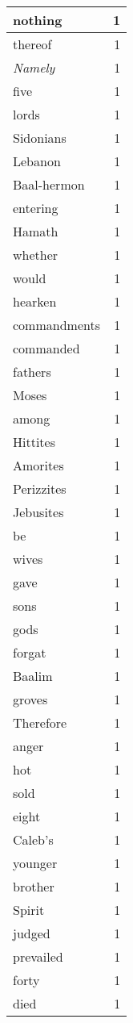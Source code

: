 \begin{center}
\begin{longtable}{l|r}
nothing & 1 \\ \hline
thereof & 1 \\ \hline
\emph{Namely} & 1 \\ \hline
five & 1 \\ \hline
lords & 1 \\ \hline
Sidonians & 1 \\ \hline
Lebanon & 1 \\ \hline
Baal-hermon & 1 \\ \hline
entering & 1 \\ \hline
Hamath & 1 \\ \hline
whether & 1 \\ \hline
would & 1 \\ \hline
hearken & 1 \\ \hline
commandments & 1 \\ \hline
commanded & 1 \\ \hline
fathers & 1 \\ \hline
Moses & 1 \\ \hline
among & 1 \\ \hline
Hittites & 1 \\ \hline
Amorites & 1 \\ \hline
Perizzites & 1 \\ \hline
Jebusites & 1 \\ \hline
be & 1 \\ \hline
wives & 1 \\ \hline
gave & 1 \\ \hline
sons & 1 \\ \hline
gods & 1 \\ \hline
forgat & 1 \\ \hline
Baalim & 1 \\ \hline
groves & 1 \\ \hline
Therefore & 1 \\ \hline
anger & 1 \\ \hline
hot & 1 \\ \hline
sold & 1 \\ \hline
eight & 1 \\ \hline
Caleb's & 1 \\ \hline
younger & 1 \\ \hline
brother & 1 \\ \hline
Spirit & 1 \\ \hline
judged & 1 \\ \hline
prevailed & 1 \\ \hline
forty & 1 \\ \hline
died & 1 \\ \hline

\end{longtable}
\end{center}

